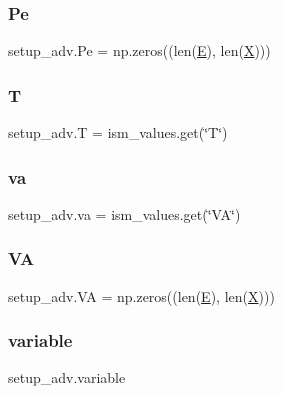 \subsubsection{\texorpdfstring{Pe}{Pe}}
{\footnotesize\ttfamily setup\+\_\+adv.\+Pe = np.\+zeros((len(\hyperlink{namespacesetup__adv_a5934fd9692b0afe75afd78fb1f301443}{E}), len(\hyperlink{namespacesetup__adv_a6d9cd2ec966fe51739f30fabc346a12b}{X})))}

\mbox{\label{namespacesetup__adv_aa30f849c7ef0825e4e89e8767cfe75dd}} 
\subsubsection{\texorpdfstring{T}{T}}
{\footnotesize\ttfamily setup\+\_\+adv.\+T = ism\+\_\+values.\+get(\char`\"{}T\char`\"{})}

\mbox{\label{namespacesetup__adv_ac2c4720a4802da1bfcd52c20885f2d58}} 
\subsubsection{\texorpdfstring{va}{va}}
{\footnotesize\ttfamily setup\+\_\+adv.\+va = ism\+\_\+values.\+get(\char`\"{}VA\char`\"{})}

\mbox{\label{namespacesetup__adv_a3542fe43032b13291dbe7a1bb97d7836}} 
\subsubsection{\texorpdfstring{VA}{VA}}
{\footnotesize\ttfamily setup\+\_\+adv.\+VA = np.\+zeros((len(\hyperlink{namespacesetup__adv_a5934fd9692b0afe75afd78fb1f301443}{E}), len(\hyperlink{namespacesetup__adv_a6d9cd2ec966fe51739f30fabc346a12b}{X})))}

\mbox{\label{namespacesetup__adv_a6d0baf11b1938f3a18333edc73c0123f}} 
\subsubsection{\texorpdfstring{variable}{variable}}
{\footnotesize\ttfamily setup\+\_\+adv.\+variable}

